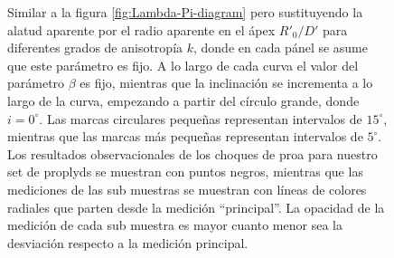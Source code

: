 \begin{figure}
  \caption{Similar a la figura \ref{fig:Lambda-Pi-diagram} pero sustituyendo la alatud aparente por el radio aparente en el ápex $R'_0/D'$ para diferentes grados de anisotropía $k$, donde en cada pánel se asume que este parámetro es fijo. A lo largo de cada curva el valor del parámetro $\beta$ es fijo,  mientras que la inclinación se incrementa a lo largo de la curva, empezando a partir del círculo grande, donde $i=0^\circ$. Las marcas circulares pequeñas representan intervalos de $15^\circ$, mientras que las marcas más pequeñas representan intervalos de $5^\circ$. Los resultados observacionales de los choques de proa para nuestro set de proplyds se muestran con puntos negros, mientras que las mediciones de las sub muestras se muestran con líneas de colores radiales que parten desde la medición ``principal''. La opacidad de la medición de cada sub muestra es mayor cuanto menor sea la desviación respecto a la medición principal.}
  \label{fig:obs-diagnostic}
\end{figure}

